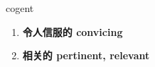 
\begin{frame}
{\huge cogent}
\begin{center}
\begin{enumerate}\Large
  \item \textbf{令人信服的 convicing}
  \item \textbf{相关的 pertinent, relevant}
\end{enumerate}
\end{center}
\end{frame}
